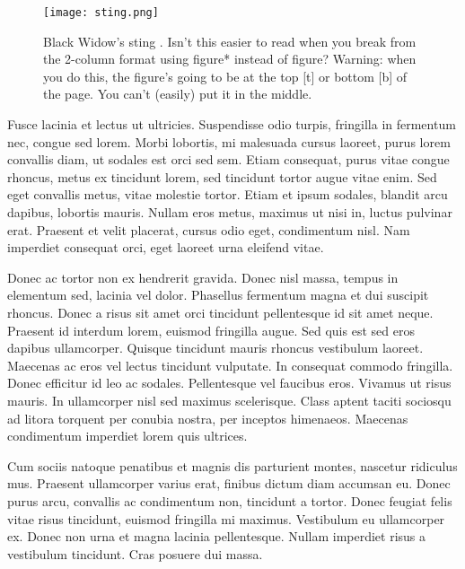 \documentclass[twocolumn]{IEEEtran}
\begin{document}
\begin{figure*}[t]
\begin{center}
\texttt{[image: sting.png]}
\end{center}
\caption{Black Widow's sting \cite{marvel}. Isn't this easier to read when you break from the 2-column format using figure* instead of figure? Warning: when you do this, the figure's going to be at the top [t] or bottom [b] of the page. You can't (easily) put it in the middle.}
\end{figure*}

Fusce lacinia et lectus ut ultricies. Suspendisse odio turpis, fringilla in fermentum nec, congue sed lorem. Morbi lobortis, mi malesuada cursus laoreet, purus lorem convallis diam, ut sodales est orci sed sem. Etiam consequat, purus vitae congue rhoncus, metus ex tincidunt lorem, sed tincidunt tortor augue vitae enim. Sed eget convallis metus, vitae molestie tortor. Etiam et ipsum sodales, blandit arcu dapibus, lobortis mauris. Nullam eros metus, maximus ut nisi in, luctus pulvinar erat. Praesent et velit placerat, cursus odio eget, condimentum nisl. Nam imperdiet consequat orci, eget laoreet urna eleifend vitae.

Donec ac tortor non ex hendrerit gravida. Donec nisl massa, tempus in elementum sed, lacinia vel dolor. Phasellus fermentum magna et dui suscipit rhoncus. Donec a risus sit amet orci tincidunt pellentesque id sit amet neque. Praesent id interdum lorem, euismod fringilla augue. Sed quis est sed eros dapibus ullamcorper. Quisque tincidunt mauris rhoncus vestibulum laoreet. Maecenas ac eros vel lectus tincidunt vulputate. In consequat commodo fringilla. Donec efficitur id leo ac sodales. Pellentesque vel faucibus eros. Vivamus ut risus mauris. In ullamcorper nisl sed maximus scelerisque. Class aptent taciti sociosqu ad litora torquent per conubia nostra, per inceptos himenaeos. Maecenas condimentum imperdiet lorem quis ultrices.

Cum sociis natoque penatibus et magnis dis parturient montes, nascetur ridiculus mus. Praesent ullamcorper varius erat, finibus dictum diam accumsan eu. Donec purus arcu, convallis ac condimentum non, tincidunt a tortor. Donec feugiat felis vitae risus tincidunt, euismod fringilla mi maximus. Vestibulum eu ullamcorper ex. Donec non urna et magna lacinia pellentesque. Nullam imperdiet risus a vestibulum tincidunt. Cras posuere dui massa.
\end{document}
